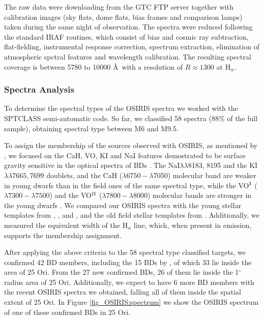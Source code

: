 \documentclass[12pt]{article}
\newcounter{subsubsubsection}[subsubsection]
\begin{document}
\label{sec_OSIRIS:reduction}
The raw data were downloading from the GTC FTP server together with calibration images (sky flats, dome flats, bias frames and comparison lamps) taken during the same night of observation. The spectra were reduced following the standard IRAF routines, which consist of bias and cosmic ray subtraction, flat-fielding, instrumental response correction, spectrum extraction, elimination of atmospheric spctral features and wavelength calibration. The resulting spectral coverage is between 5780 to 10000 \AA\ with a resolution of $R\approx1300$ at H$_\alpha$.

\subsubsection{Spectra Analysis}
\label{sec_OSIRIS:analysis}

\label{sec_OSIRIS:membership}
To determine the spectral types of the OSIRIS spectra we worked with the SPTCLASS semi-automatic code. So far, we classified 58 spectra (88\%  of the full sample), obtaining spectral type between M6 and M9.5.

To assign the membership of the sources observed with OSIRIS, as mentioned by \citet{Downes2015}, we focused on the CaH, VO, KI and NaI features demostrated to be surface gravity sensitive in the optical spectra of BDs \citep{Martin1996}. The NaI$\lambda\lambda$8183, 8195 and the KI$\lambda\lambda7665, 7699$ doublets, and the CaH ($\lambda6750-\lambda$7050) molecular band are weaker in young dwarfs than in the field ones of the same spectral type, while the VO$^{\textrm{\scriptsize{I}}}$ ($\lambda7300-\lambda7500$) and the VO$^{\textrm{\scriptsize{II}}}$ ($\lambda7800-\lambda8000$) molecular bands are stronger in the young dwarfs \citep{McGovern2004}. We compared our OSIRIS spectra with the young stellar templates from \citet{Luhman2000}, \citet{Briceno2002}, \citet{Luhman2003b} and \citet{Luhman2004}, and the old field stellar templates from \citet{Kirkpatrick1999}. Additionally, we measured the equivalent width of the H$_\alpha$ line, which, when present in emission, supports the membership assignment.

After applying the above criteria to the 58 spectral type classified targets, we confirmed 42 BD members, including the 15 BDs by \citet{Downes2015}, of which 33 lie inside the area of 25 Ori. From the 27 new confirmed BDs, 26 of them lie inside the 1$^\circ$ radius area of 25 Ori. Additionally, we expect to have 6 more BD members with the recent OSIRIS spectra we obtained, falling all of them inside the spatial extent of 25 Ori. In Figure \ref{fig_OSIRIS:spectrum} we show the OSIRIS spectrum of one of these confirmed BDs in 25 Ori.
\end{document}
